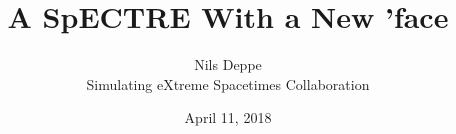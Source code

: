 \documentclass[svgnames,tikz,serif,ragged2e]{beamer}
\begin{document}
\author[\href{https://github.com/sxs-collaboration/spectre}{github.com/sxs-collaboration/spectre}]
{Nils Deppe\\ Simulating eXtreme Spacetimes Collaboration}

\date[]{April 11, 2018}
\title[A SpECTRE With a New Face] {
  \textbf{A SpECTRE With a New 'face}
}
\end{document}
